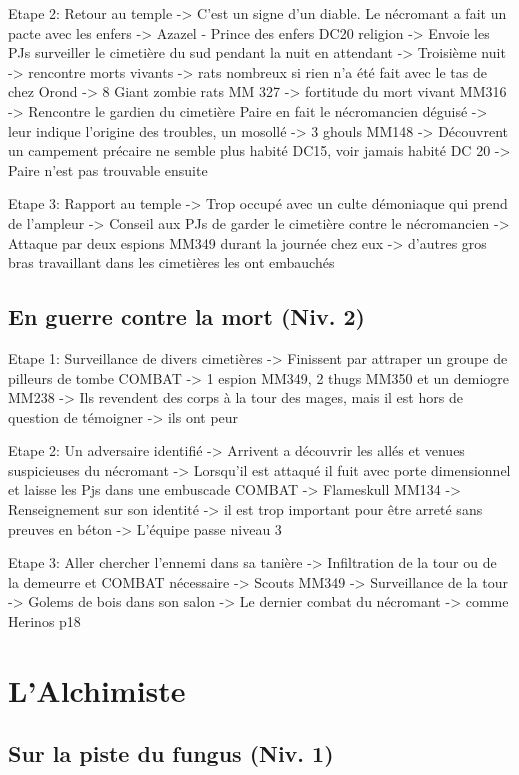 Etape 2: Retour au temple
 -> C'est un signe d'un diable. Le nécromant a fait un pacte avec les enfers -> Azazel - Prince des enfers DC20 religion
 -> Envoie les PJs surveiller le cimetière du sud pendant la nuit en attendant
 -> Troisième nuit -> rencontre morts vivants -> rats nombreux si rien n'a été fait avec le tas de chez Orond -> 8 Giant zombie rats MM 327 -> fortitude du mort vivant MM316
 -> Rencontre le gardien du cimetière Paire en fait le nécromancien déguisé -> leur indique l'origine des troubles, un mosollé -> 3 ghouls MM148
 -> Découvrent un campement précaire ne semble plus habité DC15, voir jamais habité DC 20 -> Paire n'est pas trouvable ensuite

Etape 3: Rapport au temple
 -> Trop occupé avec un culte démoniaque qui prend de l'ampleur
 -> Conseil aux PJs de garder le cimetière contre le nécromancien
 -> Attaque par deux espions MM349 durant la journée chez eux -> d'autres gros bras travaillant dans les cimetières les ont embauchés


\subsection{En guerre contre la mort (Niv. 2)}

Etape 1: Surveillance de divers cimetières
 -> Finissent par attraper un groupe de pilleurs de tombe COMBAT -> 1 espion MM349, 2 thugs MM350 et un demiogre MM238 
 -> Ils revendent des corps à la tour des mages, mais il est hors de question de témoigner -> ils ont peur

Etape 2: Un adversaire identifié
 -> Arrivent a découvrir les allés et venues suspicieuses du nécromant
 -> Lorsqu'il est attaqué il fuit avec porte dimensionnel et laisse les Pjs dans une embuscade COMBAT -> Flameskull MM134
 -> Renseignement sur son identité -> il est trop important pour être arreté sans preuves en béton
 -> L'équipe passe niveau 3

Etape 3: Aller chercher l'ennemi dans sa tanière
 -> Infiltration de la tour ou de la demeurre et COMBAT nécessaire -> Scouts MM349
 -> Surveillance de la tour
 -> Golems de bois dans son salon
 -> Le dernier combat du nécromant -> comme Herinos p18

\section{L'Alchimiste}

\subsection{Sur la piste du fungus (Niv. 1)}

